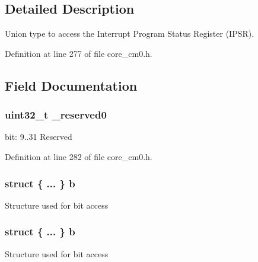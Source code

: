 \subsection{Detailed Description}
Union type to access the Interrupt Program Status Register (I\+P\+SR). 

Definition at line 277 of file core\+\_\+cm0.\+h.



\subsection{Field Documentation}
\subsubsection[{\texorpdfstring{\+\_\+reserved0}{_reserved0}}]{\setlength{\rightskip}{0pt plus 5cm}uint32\+\_\+t \+\_\+reserved0}\hypertarget{union_i_p_s_r___type_ac8a6a13838a897c8d0b8bc991bbaf7c1}{}\label{union_i_p_s_r___type_ac8a6a13838a897c8d0b8bc991bbaf7c1}
bit\+: 9..31 Reserved 

Definition at line 282 of file core\+\_\+cm0.\+h.

\subsubsection[{\texorpdfstring{b}{b}}]{\setlength{\rightskip}{0pt plus 5cm}struct \{ ... \}   b}\hypertarget{union_i_p_s_r___type_a3758147356a15906221a5625a27d9048}{}\label{union_i_p_s_r___type_a3758147356a15906221a5625a27d9048}
Structure used for bit access 
\subsubsection[{\texorpdfstring{b}{b}}]{\setlength{\rightskip}{0pt plus 5cm}struct \{ ... \}   b}\hypertarget{union_i_p_s_r___type_ad89566339da90b91a955db85c369895e}{}\label{union_i_p_s_r___type_ad89566339da90b91a955db85c369895e}
Structure used for bit access 
